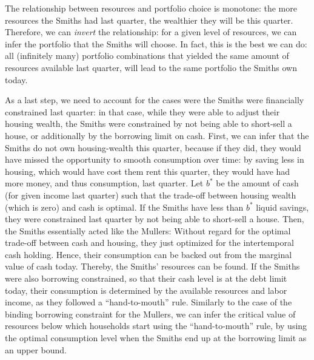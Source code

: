 \documentclass[11pt]{article} %
\begin{document}
The relationship between resources and portfolio choice is monotone: the more resources the Smiths had last quarter, the wealthier they
will be this quarter. Therefore, we can \textit{invert} the relationship: for a given level of resources, we can infer the portfolio that the
Smiths will choose. In fact, this is the best we can do: all (infinitely many) portfolio combinations that yielded the same amount of resources available last quarter, will lead to the same portfolio the Smiths own today.

As a last step, we need to account for the cases were the Smiths were financially constrained last quarter: in that case, while they were able to adjust their housing wealth, the Smiths were constrained by not being able to short-sell a house, or additionally by the borrowing limit on cash. First, we can infer that the Smiths do not own housing-wealth this quarter, because if they did, they would have missed the opportunity to smooth consumption over time: by saving less in housing, which would have cost them rent this quarter, they would have had more money, and thus consumption, last quarter. Let $b^*$ be the amount of cash (for given income last quarter) such that the trade-off between housing wealth (which is zero) and cash is optimal. If the Smiths have less than $b^*$ liquid savings, they were constrained last quarter by not being able to short-sell a house. Then, the Smiths essentially acted like the Mullers: Without regard for the optimal trade-off between cash and housing, they just optimized for the intertemporal cash holding. Hence, their consumption can be backed out from the marginal value of cash today. Thereby, the Smiths' resources can be found. If the Smiths were also borrowing constrained, so that their cash level is at the debt limit today, their consumption is determined by the available resources and labor income, as they followed a ``hand-to-mouth'' rule. Similarly to the case of the binding borrowing constraint for the Mullers, we can infer the critical value of resources below which households start using the ``hand-to-mouth'' rule, by using the optimal consumption level when the Smiths end up at the borrowing limit as an upper bound.
\end{document}
